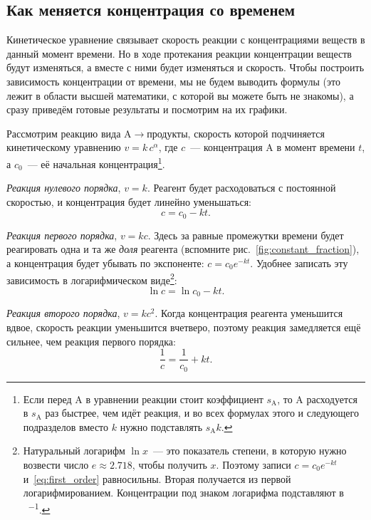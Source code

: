 \subsection*{Как меняется концентрация со временем}

Кинетическое уравнение связывает скорость реакции с концентрациями веществ в данный момент времени. Но в ходе протекания реакции концентрации веществ будут изменяться, а вместе с ними будет изменяться и скорость. Чтобы построить зависимость концентрации от времени, мы не будем выводить формулы (это лежит в области высшей математики, с которой вы можете быть не знакомы), а сразу приведём готовые результаты и посмотрим на их графики.

Рассмотрим реакцию вида $\mathrm{A} \rightarrow \text{продукты}$, скорость которой подчиняется кинетическому уравнению $v = k\,c^{\alpha}$, где $c$~--- концентрация A в момент времени $t$, а $c_0$~--- её начальная концентрация\footnote{Если перед A в уравнении реакции стоит коэффициент $s_{\mathrm{A}}$, то A расходуется в $s_{\mathrm{A}}$ раз быстрее, чем идёт реакция, и во всех формулах этого и следующего подразделов вместо $k$ нужно подставлять $s_{\mathrm{A}}k$.}.

\emph{Реакция нулевого порядка}, $v = k$. Реагент будет расходоваться с постоянной скоростью, и концентрация будет линейно уменьшаться:
\begin{equation}
    \label{eq:zero_order}
    c = c_0 - kt.
\end{equation}

\emph{Реакция первого порядка}, $v = kc$. Здесь за равные промежутки времени будет реагировать одна и та же \emph{доля} реагента (вспомните рис.~\ref{fig:constant_fraction}), а концентрация будет убывать по экспоненте: $c = c_0 e^{-kt}$. Удобнее записать эту зависимость в логарифмическом виде\footnote{Натуральный логарифм $\ln x$~--- это показатель степени, в которую нужно возвести число $e \approx \num{2,718}$, чтобы получить $x$. Поэтому записи $c = c_0 e^{-kt}$ и~\eqref{eq:first_order} равносильны. Вторая получается из первой логарифмированием. Концентрации под знаком логарифма подставляют в \unit{\ruMole\per\ruL}.}:
\begin{equation}
    \label{eq:first_order}
    \ln c = \ln c_0 - kt.
\end{equation}

\emph{Реакция второго порядка}, $v = kc^2$. Когда концентрация реагента уменьшится вдвое, скорость реакции уменьшится вчетверо, поэтому реакция замедляется ещё сильнее, чем реакция первого порядка:
\begin{equation}
    \label{eq:second_order}
    \frac{1}{c} = \frac{1}{c_0} + kt.
\end{equation}

